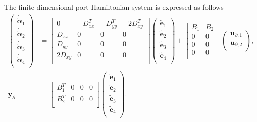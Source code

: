 \documentclass[preprint,12pt]{elsarticle}
\begin{document}
	The finite-dimensional port-Hamiltonian system is expressed as follows
	\begin{equation}
	\begin{aligned}
	\label{eq:PHdiscr_Kir}
	\begin{pmatrix}
	\dot{\bm{\tilde{\alpha}}}_1 \\
	\dot{\bm{\tilde{\alpha}}}_2 \\
	\dot{\bm{\tilde{\alpha}}}_3 \\
	\dot{\bm{\tilde{\alpha}}}_4 \\
	\end{pmatrix} &=
	\begin{bmatrix}
	0   & -D_{xx}^T   & -D_{yy}^T   & -2 D_{xy}^T\\
	D_{xx}   & 0   & 0   & 0\\
	D_{yy}   & 0   & 0   & 0\\
	2 D_{xy}   & 0   & 0   & 0 \\
	\end{bmatrix}
	\begin{pmatrix}
	\tilde{\bm{e}}_1 \\
	\tilde{\bm{e}}_2 \\
	\tilde{\bm{e}}_3 \\
	\tilde{\bm{e}}_4 \\
	\end{pmatrix}+  
	\begin{bmatrix}
	B_1 & B_2\\
	0   & 0\\
	0   & 0\\
	0   & 0 \\
	\end{bmatrix}
	\begin{pmatrix}
	\bm{u}_{\partial, 1} \\
	\bm{u}_{\partial, 2} \\
	\end{pmatrix}, \\
	\bm{y}_{\partial} &=
	\begin{bmatrix}
	B_1^T  & 0 & 0 & 0\\
	B_2^T  & 0 & 0 & 0\\
	\end{bmatrix}
	\begin{pmatrix}
	\tilde{\bm{e}}_1 \\
	\tilde{\bm{e}}_2 \\
	\tilde{\bm{e}}_3 \\
	\tilde{\bm{e}}_4 \\
	\end{pmatrix}.
	\end{aligned}
	\end{equation}
	
\end{document}
